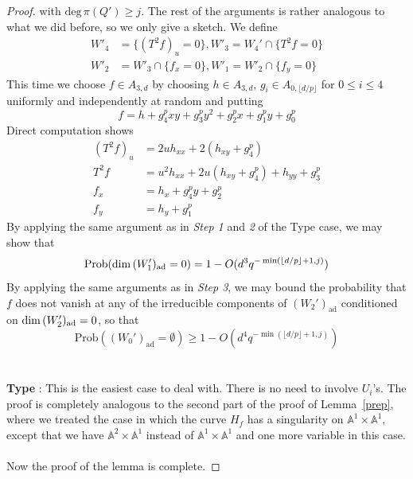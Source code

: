 \documentclass[12pt]{article}
\theoremstyle{plain}
\theoremstyle{definition}
\newcommand{\IA}{\mathbb{A}}
\renewcommand{\deg}{\mathrm{deg}\,}
\renewcommand\dim{{\rm dim\,}}
\newcommand{\<}{\langle}
\renewcommand{\>}{\rangle}
\newcommand{\Prob}{\mathrm{Prob}}
\newcommand{\ad}{\mathrm{ad}}
\newcommand{\yk}{\lfloor d/p \rfloor}
\begin{document}
\begin{proof}
with $\deg \pi(Q') \ge j$. 
The rest of the arguments is rather analogous to what we did before, so we only give a sketch. We define 
\begin{align*}
W'_4 &= \{ (T^2 f)_u = 0 \}, W'_3 = W_4' \cap \{ T^2 f = 0 \} \\
W'_2 &= W'_3 \cap \{ f_x = 0 \}, W'_1 = W'_2 \cap \{ f_y = 0 \}
\end{align*}
This time we choose $f \in A_{3, d}$ by choosing $h \in A_{3, d}$, $g_i \in A_{0, \yk}$ for $0 \le i \le 4$ uniformly and independently at random and putting 
$$ f = h + g_4^p xy + g_3^p y^2 + g_2^p x + g_1^p y + g_0^p $$
Direct computation shows 
\begin{align*}
(T^2 f )_u &= 2u h_{xx} + 2(h_{xy} + g_4^p) \\
T^2 f &= u^2 h_{xx} + 2 u (h_{xy} + g_4^p) + h_{yy} + g_3^p \\
f_x &= h_x + g_4^p y + g_2^p \\
f_y &= h_y + g_1^p 
\end{align*}
By applying the same argument as in \textit{Step 1} and \textit{2} of the Type \uppercase\expandafter{} case, we may show that 
$$ \Prob(\dim(W'_1)_\ad = 0) = 1 - O(d^3 q^{- \min(\yk + 1, j)}) $$
By applying the same arguments as in \textit{Step 3}, we may bound the probability that $f$ does not vanish at any of the irreducible components of $(W_2')_\ad$ conditioned on $\dim (W'_2)_\ad = 0$, so that 
$$ \Prob((W_0')_\ad = \emptyset) \ge 1 - O(d^4 q^{- \min(\yk + 1, j)}) $$\\\\
\textbf{Type \uppercase\expandafter{}}: This is the easiest case to deal with. There is no need to involve $U_i$'s. The proof is completely analogous to the second part of the proof of Lemma~\ref{prep}, where we treated the case in which the curve $H_f$ has a singularity on $\IA^1 \times \IA^1$, except that we have $\IA^2 \times \IA^1$ instead of $\IA^1 \times \IA^1$ and one more variable in this case. \\\\ 
Now the proof of the lemma is complete. 
\end{proof}
\end{document}
